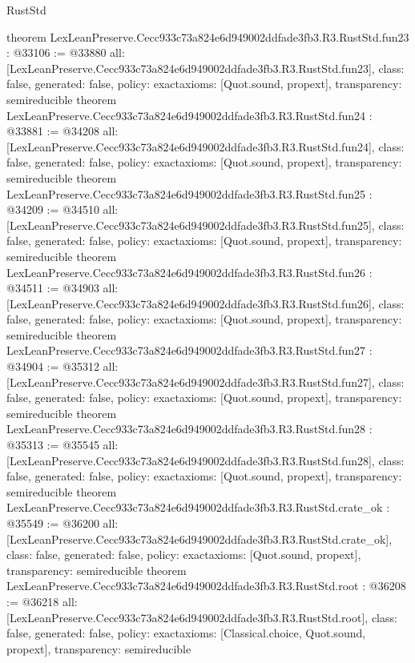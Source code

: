 \begin{lexlean}{RustStd}
\begin{coremodule}
{}
theorem LexLeanPreserve.Cecc933c73a824e6d949002ddfade3fb3.R3.RustStd.fun23 : @33106 := @33880 {
  all: [LexLeanPreserve.Cecc933c73a824e6d949002ddfade3fb3.R3.RustStd.fun23],
  class: false,
  generated: false,
  policy: exact{axioms: [Quot.sound, propext]},
  transparency: semireducible
}
theorem LexLeanPreserve.Cecc933c73a824e6d949002ddfade3fb3.R3.RustStd.fun24 : @33881 := @34208 {
  all: [LexLeanPreserve.Cecc933c73a824e6d949002ddfade3fb3.R3.RustStd.fun24],
  class: false,
  generated: false,
  policy: exact{axioms: [Quot.sound, propext]},
  transparency: semireducible
}
theorem LexLeanPreserve.Cecc933c73a824e6d949002ddfade3fb3.R3.RustStd.fun25 : @34209 := @34510 {
  all: [LexLeanPreserve.Cecc933c73a824e6d949002ddfade3fb3.R3.RustStd.fun25],
  class: false,
  generated: false,
  policy: exact{axioms: [Quot.sound, propext]},
  transparency: semireducible
}
theorem LexLeanPreserve.Cecc933c73a824e6d949002ddfade3fb3.R3.RustStd.fun26 : @34511 := @34903 {
  all: [LexLeanPreserve.Cecc933c73a824e6d949002ddfade3fb3.R3.RustStd.fun26],
  class: false,
  generated: false,
  policy: exact{axioms: [Quot.sound, propext]},
  transparency: semireducible
}
theorem LexLeanPreserve.Cecc933c73a824e6d949002ddfade3fb3.R3.RustStd.fun27 : @34904 := @35312 {
  all: [LexLeanPreserve.Cecc933c73a824e6d949002ddfade3fb3.R3.RustStd.fun27],
  class: false,
  generated: false,
  policy: exact{axioms: [Quot.sound, propext]},
  transparency: semireducible
}
theorem LexLeanPreserve.Cecc933c73a824e6d949002ddfade3fb3.R3.RustStd.fun28 : @35313 := @35545 {
  all: [LexLeanPreserve.Cecc933c73a824e6d949002ddfade3fb3.R3.RustStd.fun28],
  class: false,
  generated: false,
  policy: exact{axioms: [Quot.sound, propext]},
  transparency: semireducible
}
theorem LexLeanPreserve.Cecc933c73a824e6d949002ddfade3fb3.R3.RustStd.crate_ok : @35549 := @36200 {
  all: [LexLeanPreserve.Cecc933c73a824e6d949002ddfade3fb3.R3.RustStd.crate_ok],
  class: false,
  generated: false,
  policy: exact{axioms: [Quot.sound, propext]},
  transparency: semireducible
}
theorem LexLeanPreserve.Cecc933c73a824e6d949002ddfade3fb3.R3.RustStd.root : @36208 := @36218 {
  all: [LexLeanPreserve.Cecc933c73a824e6d949002ddfade3fb3.R3.RustStd.root],
  class: false,
  generated: false,
  policy: exact{axioms: [Classical.choice, Quot.sound, propext]},
  transparency: semireducible
}


\end{coremodule}
\end{lexlean}
